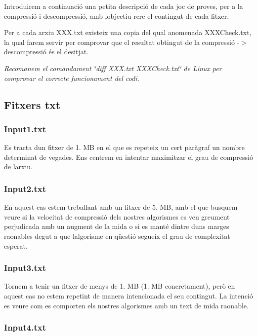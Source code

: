 Introduirem a continuació una petita descripció de cada joc de proves, per a la compressió i descompressió, amb l\textquotesingle{}objectiu rere el contingut de cada fitxer.

Per a cada arxiu X\+X\+X.\+txt existeix una copia del qual anomenada X\+X\+X\+Check.\+txt, la qual farem servir per comprovar que el resultat obtingut de la compressió -\/$>$ descompressió és el desitjat.

{\itshape Recomanem el comandament \char`\"{}diff X\+X\+X.\+txt X\+X\+X\+Check.\+txt\char`\"{} de Linux per comprovar el correcte funcionament del codi.}

\subsection*{Fitxers txt}

\subsubsection*{Input1.\+txt}

Es tracta d\textquotesingle{}un fitxer de 1. MB en el que es repeteix un cert paràgraf un nombre determinat de vegades. Ens centrem en intentar maximitzar el grau de compressió de l\textquotesingle{}arxiu.

\subsubsection*{Input2.\+txt}

En aquest cas estem treballant amb un fitxer de 5. MB, amb el que busquem veure si la velocitat de compressió dels nostres algorismes es veu greument perjudicada amb un augment de la mida o si es manté dintre d\textquotesingle{}uns marges raonables degut a que l\textquotesingle{}algorisme en qüestió segueix el grau de complexitat esperat.

\subsubsection*{Input3.\+txt}

Tornem a tenir un fitxer de menys de 1. MB (1. MB concretament), però en aquest cas no estem repetint de manera intencionada el seu contingut. La intenció es veure com es comporten els nostres algorismes amb un text de mida raonable.

\subsubsection*{Input4.\+txt}

